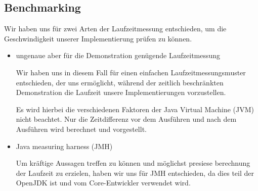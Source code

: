 \documentclass[a4paper]{article}
\begin{document}
\newpage

\subsection{Benchmarking}
Wir haben uns für zwei Arten der Laufzeitmessung entschieden, um die Geschwindigkeit unserer Implementierung prüfen zu können.

\begin{itemize}
	\item ungenaue aber für die Demonstration genügende Laufzeitmessung
		\begin{answer}
			Wir haben uns in diesem Fall für einen einfachen Laufzeitmessungsmuster entschieden, der uns ermöglicht, während der zeitlich beschränkten Demonstration die Laufzeit unsere Implementierungen vorzustellen.

			Es wird hierbei die verschiedenen Faktoren der Java Virtual Machine (JVM) nicht beachtet.
			Nur die Zeitdifferenz vor dem Ausführen und nach dem Ausführen wird berechnet und vorgestellt.
		\end{answer}
	\item Java measuring harness (JMH)
		\begin{answer}
			Um kräftige Aussagen treffen zu können und möglichst presiese berechnung der Laufzeit zu erzielen, haben wir uns für JMH entschieden, da dies teil der OpenJDK ist und vom Core-Entwickler verwendet wird.
		\end{answer}
\end{itemize}
\end{document}
